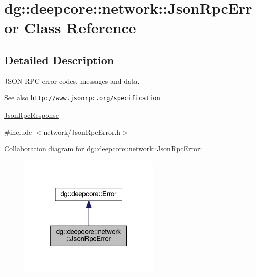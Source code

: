 \hypertarget{classdg_1_1deepcore_1_1network_1_1_json_rpc_error}{}\section{dg\+:\+:deepcore\+:\+:network\+:\+:Json\+Rpc\+Error Class Reference}
\label{classdg_1_1deepcore_1_1network_1_1_json_rpc_error}


\subsection{Detailed Description}
J\+S\+O\+N-\/\+R\+PC error codes, messages and data. 

\begin{DoxySeeAlso}{See also}
\href{http://www.jsonrpc.org/specification}{\tt http\+://www.\+jsonrpc.\+org/specification} 

\hyperlink{classdg_1_1deepcore_1_1network_1_1_json_rpc_response}{Json\+Rpc\+Response} 
\end{DoxySeeAlso}


{\ttfamily \#include $<$network/\+Json\+Rpc\+Error.\+h$>$}



Collaboration diagram for dg\+:\+:deepcore\+:\+:network\+:\+:Json\+Rpc\+Error\+:
\nopagebreak
\begin{figure}[H]
\begin{center}
\leavevmode
\includegraphics[width=193pt]{classdg_1_1deepcore_1_1network_1_1_json_rpc_error__coll__graph}
\end{center}
\end{figure}
